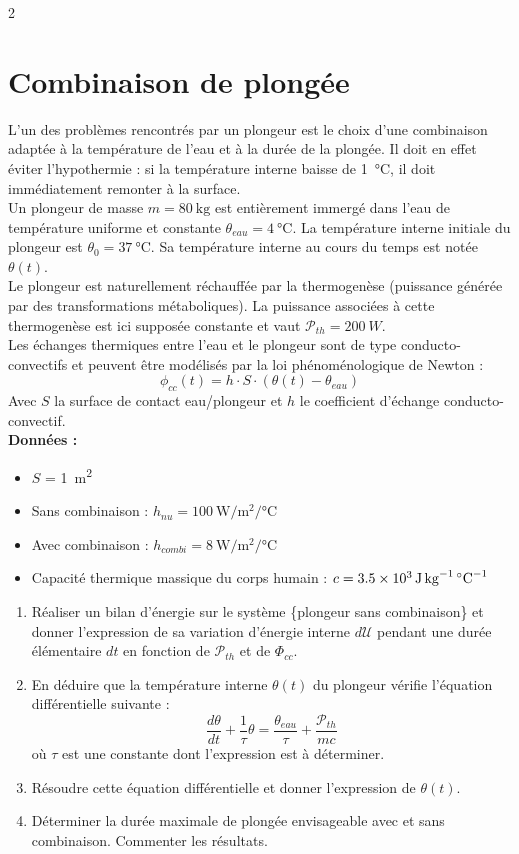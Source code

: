 \documentclass[a4paper,11pt,fleqn]{article}%
\begin{document}
\begin{multicols}{2}
\section{Combinaison de plongée}
L'un des problèmes rencontrés par un plongeur est le choix d'une combinaison adaptée à la température de l'eau et à la durée de la plongée. Il doit en effet éviter l'hypothermie : si la température interne baisse de \SI{1}{\celsius}, il doit immédiatement remonter à la surface.\\
Un plongeur de masse $m=\SI{80}{\kilo\gram}$ est entièrement immergé dans l'eau de température uniforme et constante $\theta_{eau} = \SI{4}{\celsius}$. La température interne initiale du plongeur est $\theta_0=\SI{37}{\celsius}$. Sa température interne au cours du temps est notée $\theta (t)$.\\
Le plongeur est naturellement réchauffée par la thermogenèse (puissance générée par des transformations métaboliques). La puissance associées à cette thermogenèse est ici supposée constante et vaut $\mathcal{P}_{th}=\SI{200}{W}$.\\
Les échanges thermiques entre l'eau et le plongeur sont de type conducto-convectifs et peuvent être modélisés par la loi phénoménologique de Newton : $$\phi_{cc}(t) = h \cdot S \cdot (\theta(t) - \theta_{eau})$$
Avec $S$ la surface de contact eau/plongeur et $h$ le coefficient d'échange conducto-convectif.\\
\textbf{Données :}
\begin{itemize}
	\item $S$ = \SI{1}{\meter\squared}
	\item Sans combinaison : $h_{nu} = \SI{100}{\watt\per\meter\squared\per\celsius}$
	\item Avec combinaison : $h_{combi} = \SI{8}{\watt\per\meter\squared\per\celsius}$
	\item Capacité thermique massique du corps humain : $c =\SI{3,5E3}{\joule\per\kilo\gram\per\celsius}$
\end{itemize}
\begin{enumerate}
	\item Réaliser un bilan d'énergie sur le système \{plongeur sans combinaison\} et donner l'expression de sa variation d'énergie interne $d\mathcal{U}$ pendant une durée élémentaire $dt$ en fonction de $\mathcal{P}_{th}$ et de $\Phi_{cc}$.
	\item En déduire que la température interne $\theta(t)$ du plongeur vérifie l'équation différentielle suivante :
	$$\dfrac{d\theta}{dt} + \dfrac{1}{\tau}\theta = \dfrac{\theta_{eau}}{\tau} + \dfrac{\mathcal{P}_{th}}{mc} $$
	où $\tau$  est une constante dont l'expression est à déterminer.
	\item Résoudre cette équation différentielle et donner l'expression de $\theta(t)$.
	\item Déterminer la durée maximale de plongée envisageable avec et sans combinaison. Commenter les résultats. 
\end{enumerate}

\end{multicols}
\end{document}
